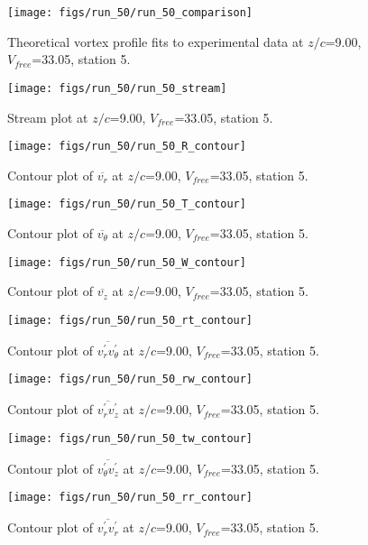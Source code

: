 \begin{figure}[H]
\centering
\texttt{[image: figs/run\_50/run\_50\_comparison]}
\caption{Theoretical vortex profile fits to experimental data at $z/c$=9.00, $V_{free}$=33.05, station 5.}
\end{figure}


\begin{figure}[H]
\centering
\texttt{[image: figs/run\_50/run\_50\_stream]}
\caption{Stream plot at $z/c$=9.00, $V_{free}$=33.05, station 5.}
\end{figure}


\begin{figure}[H]
\centering
\texttt{[image: figs/run\_50/run\_50\_R\_contour]}
\caption{Contour plot of $\overline{v_{r}}$ at $z/c$=9.00, $V_{free}$=33.05, station 5.}
\end{figure}


\begin{figure}[H]
\centering
\texttt{[image: figs/run\_50/run\_50\_T\_contour]}
\caption{Contour plot of $\overline{v_{\theta}}$ at $z/c$=9.00, $V_{free}$=33.05, station 5.}
\end{figure}


\begin{figure}[H]
\centering
\texttt{[image: figs/run\_50/run\_50\_W\_contour]}
\caption{Contour plot of $\overline{v_{z}}$ at $z/c$=9.00, $V_{free}$=33.05, station 5.}
\end{figure}


\begin{figure}[H]
\centering
\texttt{[image: figs/run\_50/run\_50\_rt\_contour]}
\caption{Contour plot of $\overline{v_{r}^{\prime} v_{\theta}^{\prime}}$ at $z/c$=9.00, $V_{free}$=33.05, station 5.}
\end{figure}


\begin{figure}[H]
\centering
\texttt{[image: figs/run\_50/run\_50\_rw\_contour]}
\caption{Contour plot of $\overline{v_{r}^{\prime} v_{z}^{\prime}}$ at $z/c$=9.00, $V_{free}$=33.05, station 5.}
\end{figure}


\begin{figure}[H]
\centering
\texttt{[image: figs/run\_50/run\_50\_tw\_contour]}
\caption{Contour plot of $\overline{v_{\theta}^{\prime} v_{z}^{\prime}}$ at $z/c$=9.00, $V_{free}$=33.05, station 5.}
\end{figure}


\begin{figure}[H]
\centering
\texttt{[image: figs/run\_50/run\_50\_rr\_contour]}
\caption{Contour plot of $\overline{v_{r}^{\prime} v_{r}^{\prime}}$ at $z/c$=9.00, $V_{free}$=33.05, station 5.}
\end{figure}


